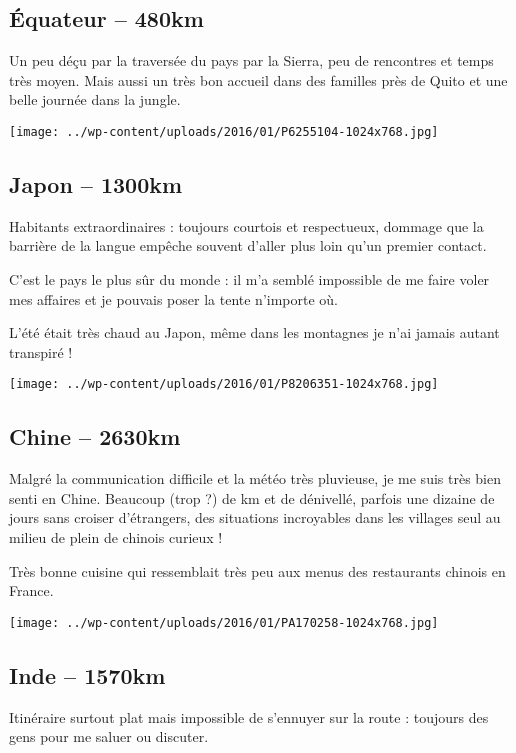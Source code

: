  \pagebreak
 \subsection*{\'Equateur – 480km}
 Un peu déçu par la traversée du pays par la Sierra, peu de rencontres et temps très moyen. Mais aussi un très bon accueil dans des familles près de Quito et une belle journée dans la jungle. 
\begin{center} \texttt{[image: ../wp-content/uploads/2016/01/P6255104-1024x768.jpg]} \end{center}

\pagebreak
 \subsection*{Japon – 1300km}
 Habitants extraordinaires : toujours courtois et respectueux, dommage que la barrière de la langue empêche souvent d'aller plus loin qu'un premier contact. 

 C'est le pays le plus sûr du monde : il m'a semblé impossible de me faire voler mes affaires et je pouvais poser la tente n'importe où. 

 L'été était très chaud au Japon, même dans les montagnes je n'ai jamais autant transpiré ! 
\begin{center} \texttt{[image: ../wp-content/uploads/2016/01/P8206351-1024x768.jpg]} \end{center}

\pagebreak
 \subsection*{Chine – 2630km}
 Malgré la communication difficile et la météo très pluvieuse, je me suis très bien senti en Chine. Beaucoup (trop ?) de km et de dénivellé, parfois une dizaine de jours sans croiser d'étrangers, des situations incroyables dans les villages seul au milieu de plein de chinois curieux ! 

 Très bonne cuisine qui ressemblait très peu aux menus des restaurants chinois en France.
\begin{center} \texttt{[image: ../wp-content/uploads/2016/01/PA170258-1024x768.jpg]} \end{center}

\pagebreak
 \subsection*{Inde – 1570km}
 Itinéraire surtout plat mais impossible de s'ennuyer sur la route : toujours des gens pour me saluer ou discuter.

